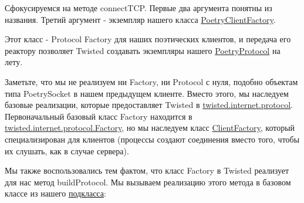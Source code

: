 
Сфокусируемся на методе connectTCP. Первые два аргумента понятны из названия. 
Третий аргумент - экземпляр нашего класса  
\href{http://github.com/jdavisp3/twisted-intro/blob/master/twisted-client-2/get-poetry.py#L69}{PoetryClientFactory}. 
 
Этот класс - Protocol Factory для наших поэтических клиентов, и 
передача его реактору позволяет Twisted создавать экземпляры нашего  
\href{http://github.com/jdavisp3/twisted-intro/blob/master/twisted-client-2/get-poetry.py#L52}{PoetryProtocol} 
на лету.



Заметьте, что мы не реализуем ни Factory, ни Protocol 
с нуля, подобно объектам типа PoetrySocket в нашем предыдущем 
клиенте. Вместо этого, мы наследуем базовые реализации, которые 
предоставляет Twisted в 
\href{http://twistedmatrix.com/trac/browser/tags/releases/twisted-8.2.0/twisted/internet/protocol.py}{twisted.internet.protocol}. 
Первоначальный базовый класс Factory находится в 
\href{http://twistedmatrix.com/trac/browser/tags/releases/twisted-8.2.0/twisted/internet/protocol.py#L24}{twisted.internet.protocol.Factory}, 
но мы наследуем класс  
\href{http://twistedmatrix.com/trac/browser/tags/releases/twisted-8.2.0/twisted/internet/protocol.py#L103}{ClientFactory}, который специализирован для 
клиентов (процессы создают соединения вместо того, чтобы их слушать, как в 
случае сервера). 



Мы также воспользовались тем фактом, что класс Factory в Twisted 
реализует для нас метод buildProtocol. Мы вызываем реализацию этого 
метода в базовом классе из нашего   
\href{http://github.com/jdavisp3/twisted-intro/blob/master/twisted-client-2/get-poetry.py#L79}{подкласса}:

